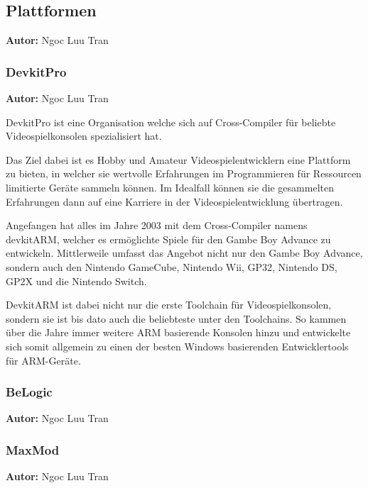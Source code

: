 \documentclass[11pt,a4paper]{scrartcl}
\newcommand{\AutorNgoc} {
    \vspace{-4mm}
    \large \textbf{Autor:} Ngoc Luu Tran \normalsize
    \vspace{2mm}
}
\begin{document}
\newpage


\subsection{Plattformen} \label{Plattformen}
\AutorNgoc


\subsubsection{DevkitPro}
\AutorNgoc

DevkitPro ist eine Organisation welche sich auf Cross-Compiler f\"{u}r beliebte Videospielkonsolen spezialisiert hat.

Das Ziel dabei ist es Hobby und Amateur Videospielentwicklern eine Plattform zu bieten, in welcher sie wertvolle Erfahrungen im Programmieren f\"{u}r Ressourcen limitierte Ger\"{a}te sammeln k\"{o}nnen. Im Idealfall k\"{o}nnen sie die gesammelten Erfahrungen dann auf eine Karriere in der Videospielentwicklung \"{u}bertragen.

Angefangen hat alles im Jahre 2003 mit dem Cross-Compiler namens devkitARM, welcher es erm\"{o}glichte Spiele f\"{u}r den Gambe Boy Advance zu entwickeln. Mittlerweile umfasst das Angebot nicht nur den Gambe Boy Advance, sondern auch den Nintendo GameCube, Nintendo Wii, GP32, Nintendo DS, GP2X und die Nintendo Switch. 

DevkitARM ist dabei nicht nur die erste Toolchain f\"{u}r Videospielkonsolen, sondern sie ist bis dato auch die beliebteste unter den Toolchains. So kammen \"{u}ber die Jahre immer weitere ARM basierende Konsolen hinzu und entwickelte sich somit allgemein zu einen der besten Windows basierenden Entwicklertools f\"{u}r ARM-Ger\"{a}te. 


\subsubsection{BeLogic}
\AutorNgoc


\subsubsection{MaxMod}
\AutorNgoc


\newpage
\end{document}
